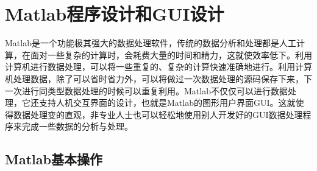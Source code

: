 \setcounter{figure}{0}
\setcounter{table}{0}
\setcounter{equation}{0}
\section{Matlab程序设计和GUI设计}
Matlab是一个功能极其强大的数据处理软件，传统的数据分析和处理都是人工计算，在面对一些复杂的计算时，会耗费大量的时间和精力，这就使效率低下。利用计算机进行数据处理，可以将一些重复的、复杂的计算快速准确地进行。利用计算机处理数据，除了可以省时省力外，可以将做过一次数据处理的源码保存下来，下一次进行同类型数据处理的时候可以重复利用。Matlab不仅仅可以进行数据处理，它还支持人机交互界面的设计，也就是Matlab的图形用户界面GUI。这就使得数据处理变的直观，非专业人士也可以轻松地使用别人开发好的GUI数据处理程序来完成一些数据的分析与处理。
\subsection{Matlab基本操作}
